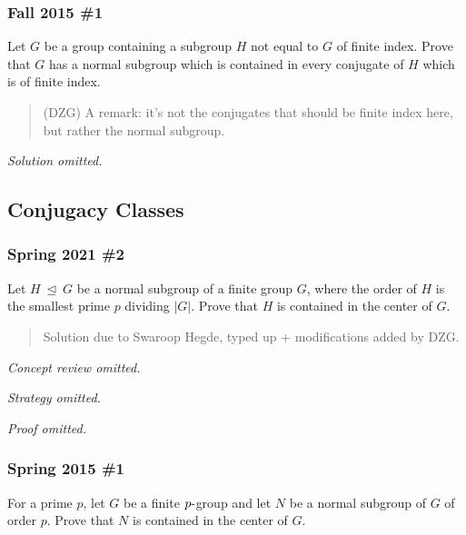 \hypertarget{fall-2015-1}{%
\subsubsection{Fall 2015 \#1}\label{fall-2015-1}}

Let \(G\) be a group containing a subgroup \(H\) not equal to \(G\) of
finite index. Prove that \(G\) has a normal subgroup which is contained
in every conjugate of \(H\) which is of finite index.

\begin{quote}
(DZG) A remark: it's not the conjugates that should be finite index
here, but rather the normal subgroup.
\end{quote}

\emph{Solution omitted.}

\hypertarget{conjugacy-classes}{%
\subsection{Conjugacy Classes}\label{conjugacy-classes}}

\hypertarget{spring-2021-2}{%
\subsubsection{Spring 2021 \#2}\label{spring-2021-2}}

Let \(H {~\trianglelefteq~}G\) be a normal subgroup of a finite group
\(G\), where the order of \(H\) is the smallest prime \(p\) dividing
\({\left\lvert {G} \right\rvert}\). Prove that \(H\) is contained in the
center of \(G\).

\begin{quote}
Solution due to Swaroop Hegde, typed up + modifications added by DZG.
\end{quote}

\emph{Concept review omitted.}

\emph{Strategy omitted.}

\emph{Proof omitted.}

\hypertarget{spring-2015-1}{%
\subsubsection{Spring 2015 \#1}\label{spring-2015-1}}

For a prime \(p\), let \(G\) be a finite \(p{\hbox{-}}\)group and let
\(N\) be a normal subgroup of \(G\) of order \(p\). Prove that \(N\) is
contained in the center of \(G\).

